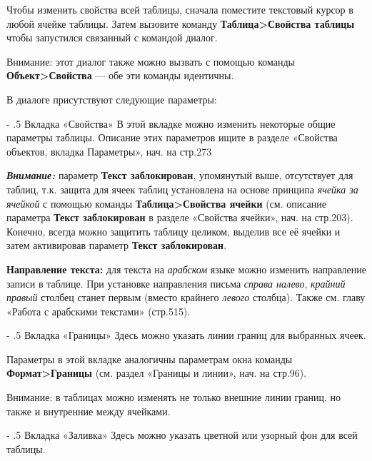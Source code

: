 \documentclass[a4paper,10pt]{article}
\makeatletter
\renewcommand\paragraph{%
   \@startsection{paragraph}{4}{0mm}%
      {-\baselineskip}%
      {.5\baselineskip}%
      {\normalfont\normalsize\bfseries}}
\makeatother
\begin{document}
Чтобы изменить свойства всей таблицы, сначала поместите текстовый курсор в любой ячейке таблицы. Затем вызовите команду \textbf{Таблица>Свойства таблицы} чтобы запустился связанный с командой диалог.

Внимание: этот диалог также можно вызвать с помощью команды \textbf{Объект>Свойства} --- обе эти команды идентичны.

В диалоге присутствуют следующие параметры:

\paragraph{Вкладка «Свойства»}
В этой вкладке можно изменить некоторые общие параметры таблицы. Описание этих параметров ищите в разделе «Свойства объектов, вкладка Параметры», нач. на стр.273

\textit{\textbf{Внимание:}} параметр \textbf{Текст заблокирован}, упомянутый выше, отсутствует для таблиц, т.к. защита для ячеек таблиц установлена на основе принципа \textit{ячейка за ячейкой} с помощью команды \textbf{Таблица>Свойства ячейки} (см. описание параметра \textbf{Текст заблокирован} в разделе «Свойства ячейки», нач. на стр.203). Конечно, всегда можно защитить таблицу целиком, выделив все её ячейки и затем активировав параметр \textbf{Текст заблокирован}.

\textbf{Направление текста:} для текста на \textit{арабском} языке можно изменить направление записи в таблице. При установке направления письма \textit{справа налево}, \textit{крайний правый} столбец станет первым (вместо крайнего \textit{левого} столбца). Также см. главу «Работа с арабскими текстами» (стр.515).

\paragraph{Вкладка «Границы»}
Здесь можно указать линии границ для выбранных ячеек.

Параметры в этой вкладке аналогичны параметрам окна команды \textbf{Формат>Границы} (см. раздел «Границы и линии», нач. на стр.96).

Внимание: в таблицах можно изменять не только внешние линии границ, но также и внутренние между ячейками.

\paragraph{Вкладка «Заливка»}
Здесь можно указать цветной или узорный фон для всей таблицы.
\end{document}

